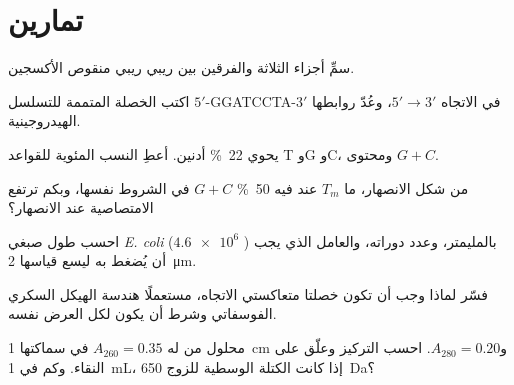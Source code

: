 \section{تمارين}

\begin{exercise}[$\star$]\label{exo:b1:nucleic-acids:1}
سمِّ أجزاء  الثلاثة والفرقين بين  ريبي 
ريبي منقوص الأكسجين.
\end{exercise}

\begin{exercise}[$\star$]\label{exo:b1:nucleic-acids:2}
اكتب الخصلة المتممة للتسلسل $5'$-GGATCCTA-$3'$ في الاتجاه $5' \to 3'$،
وعُدّ روابطها الهيدروجينية.
\end{exercise}

\begin{exercise}[$\star$]\label{exo:b1:nucleic-acids:3}
 يحوي \qty{22}{\%} أدنين. أعطِ النسب المئوية للقواعد T وG وC، ومحتوى
$G + C$.
\end{exercise}

\begin{exercise}[$\star$]\label{exo:b1:nucleic-acids:4}
من شكل الانصهار، ما $T_m$ عند  فيه \qty{50}{\%} $G + C$ في الشروط
نفسها، وبكم ترتفع الامتصاصية عند الانصهار؟
\end{exercise}

\begin{exercise}[$\star\star$]\label{exo:b1:nucleic-acids:5}
احسب طول صبغي \emph{E. coli} ($\num{4.6e6}$ ) بالمليمتر،
وعدد دوراته، والعامل الذي يجب أن يُضغط به ليسع  قياسها
\qty{2}{\micro m}.
\end{exercise}

\begin{exercise}[$\star\star$]\label{exo:b1:nucleic-acids:6}
فسّر لماذا وجب أن تكون خصلتا  متعاكستي الاتجاه، مستعملًا هندسة
الهيكل السكري الفوسفاتي وشرط أن يكون لكل  العرض نفسه.
\end{exercise}

\begin{exercise}[$\star\star$]\label{exo:b1:nucleic-acids:7}
محلول من  له $A_{260} = 0.35$ في  سماكتها \qty{1}{cm}
و$A_{280} = 0.20$. احسب التركيز وعلّق على النقاء. وكم  في
\qty{1}{mL}، إذا كانت الكتلة الوسطية للزوج \qty{650}{Da}؟
\end{exercise}

